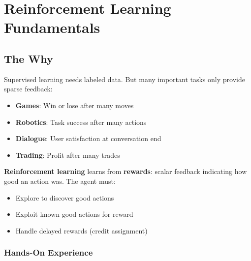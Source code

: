 
\chapter{Reinforcement Learning Fundamentals}


\section{The Why}


Supervised learning needs labeled data. But many important tasks only provide sparse feedback:
\begin{itemize}
    \item \textbf{Games}: Win or lose after many moves
    \item \textbf{Robotics}: Task success after many actions
    \item \textbf{Dialogue}: User satisfaction at conversation end
    \item \textbf{Trading}: Profit after many trades
\end{itemize}

\textbf{Reinforcement learning} learns from \textbf{rewards}: scalar feedback indicating how good an action was. The agent must:
\begin{itemize}
    \item Explore to discover good actions
    \item Exploit known good actions for reward
    \item Handle delayed rewards (credit assignment)
\end{itemize}

\subsection{Hands-On Experience}

\begin{marginfigure}
\caption{Gridworld: navigate from S to G, avoiding obstacles.}
\end{marginfigure}

